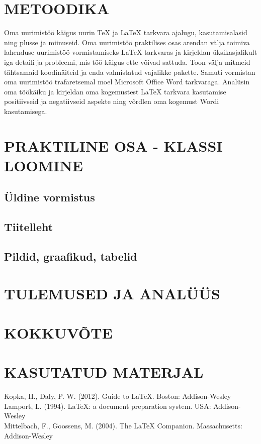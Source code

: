 \documentclass{21kuur}
\begin{document}
\chapter{METOODIKA}
Oma uurimist\"{o}\"{o} k\"{a}igus uurin TeX ja LaTeX tarkvara ajalugu, kasutamisalasid ning plusse ja miinuseid. Oma uurimist\"{o}\"{o} praktilises osas arendan v\"{a}lja toimiva lahenduse uurimist\"{o}\"{o} vormistamiseks LaTeX tarkvaras ja kirjeldan \"{u}ksikasjalikult iga detaili ja probleemi, mis t\"{o}\"{o} k\"{a}igus ette v\~{o}ivad sattuda. Toon v\"{a}lja mitmeid t\"{a}htsamaid koodin\"{a}iteid ja enda valmistatud vajalikke pakette. Samuti vormistan oma uurimist\"{o}\"{o} trafaretsemal moel Microsoft Office Word tarkvaraga. Anal\"{u}sin oma t\"{o}\"{o}k\"{a}iku ja kirjeldan oma kogemustest LaTeX tarkvara kasutamise positiivseid ja negatiivseid aspekte ning v\~{o}rdlen oma kogemust Wordi kasutamisega.

\chapter{PRAKTILINE OSA - KLASSI LOOMINE}
\section{Üldine vormistus}
\section{Tiitelleht}
\section{Pildid, graafikud, tabelid}

\chapter{TULEMUSED JA ANALÜÜS}
\newpage
\chapter*{KOKKUVÕTE}
\newpage
\chapter*{KASUTATUD MATERJAL}
Kopka, H., Daly, P. W. (2012). Guide to LaTeX. Boston: Addison-Wesley
\\Lamport, L. (1994). LaTeX: a document preparation system. USA: Addison-Wesley
\\Mittelbach, F., Goossens, M. (2004). The LaTeX Companion. Massachusetts: Addison-Wesley
\end{document}
